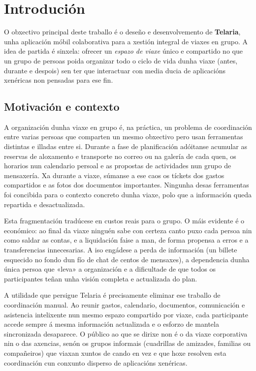 \chapter{Introdución}

O obxectivo principal deste traballo é o deseño e desenvolvemento de \textbf{Telaria},
unha aplicación móbil colaborativa para a xestión integral de viaxes en grupo. A idea
de partida é sinxela: ofrecer un \textit{espazo de viaxe} único e compartido no que un
grupo de persoas poida organizar todo o ciclo de vida dunha viaxe (antes, durante e despois) sen
ter que interactuar con media ducia de aplicacións xenéricas non pensadas para ese fin.

\section{Motivación e contexto}

A organización dunha viaxe en grupo é, na práctica, un problema de coordinación entre
varias persoas que comparten un mesmo obxectivo pero usan ferramentas distintas e
illadas entre si. Durante a fase de planificación adóitanse acumular as reservas de
aloxamento e transporte no correo ou na galería de cada quen, os horarios nun calendario
persoal e as propostas de actividades nun grupo de mensaxería. Xa durante a viaxe,
súmanse a ese caos os tíckets dos gastos compartidos e as fotos dos documentos
importantes. Ningunha desas ferramentas foi concibida para o contexto concreto dunha
viaxe, polo que a información queda repartida e desactualizada.

Esta fragmentación tradúcese en custos reais para o grupo. O máis evidente é o
económico: ao final da viaxe ninguén sabe con certeza canto puxo cada persoa nin como
saldar as contas, e a liquidación faise a man, de forma propensa a erros e a
transferencias innecesarias. A iso engádese a perda de información (un billete esquecido
no fondo dun fío de chat de centos de mensaxes), a dependencia dunha única persoa que «leva» a
organización e a dificultade de que todos os participantes teñan unha visión completa e
actualizada do plan.

A utilidade que persigue Telaria é precisamente eliminar ese traballo de
coordinación manual. Ao reunir gastos, calendario, documentos, comunicación e asistencia
intelixente nun mesmo espazo compartido por viaxe, cada participante accede sempre á
mesma información actualizada e o esforzo de mantela sincronizada desaparece. O público
ao que se dirixe non é o da viaxe corporativa nin o das axencias, senón os grupos
informais (cuadrillas de amizades, familias ou compañeiros) que viaxan xuntos de cando
en vez e que hoxe resolven esta coordinación cun conxunto disperso de aplicacións
xenéricas.

